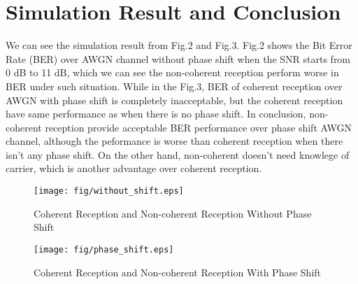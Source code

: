 \documentclass[technicalreport]{ieicej}
\begin{document}
\section{Simulation Result and Conclusion}
We can see the simulation result from Fig.2 and Fig.3. Fig.2 shows the Bit Error Rate (BER) over AWGN channel without phase shift when the SNR starts from 0 dB to 11 dB, which we can see the non-coherent reception perform worse in BER under such situation. While in the Fig.3, BER of coherent reception over AWGN with phase shift is completely inacceptable, but the coherent reception have same performance as when there is no phase shift.
In conclusion, non-coherent reception provide acceptable BER performance over phase shift AWGN channel, although the peformance is worse than coherent reception when there isn't any phase shift. On the other hand, non-coherent doesn't need knowlege of carrier, which is another advantage over coherent reception.

\begin{figure}[tbp]
	\begin{center}
		\vspace{0cm}
		\texttt{[image: fig/without\_shift.eps]}
		\caption{Coherent Reception and Non-coherent Reception Without Phase Shift}
		\label{fig:sample}
	\end{center}
\end{figure}

\begin{figure}[tbp]
	\begin{center}
		\vspace{0cm}
		\texttt{[image: fig/phase\_shift.eps]}
		\caption{Coherent Reception and Non-coherent Reception With Phase Shift}
		\label{fig:sample}
	\end{center}
\end{figure}
\end{document}
